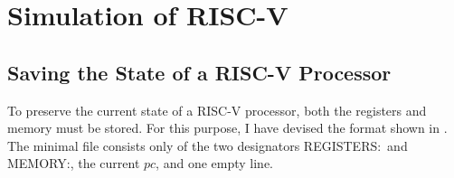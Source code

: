 \section{Simulation of RISC-V}

\subsection{Saving the State of a RISC-V Processor}\label{statefile}
To preserve the current state of a RISC-V processor, both the registers and memory must be stored.
For this purpose, I have devised the format shown in . The minimal file consists only of the two designators \dq REGISTERS:\dq\ and \dq MEMORY:\dq, the current $pc$, and one empty line.
